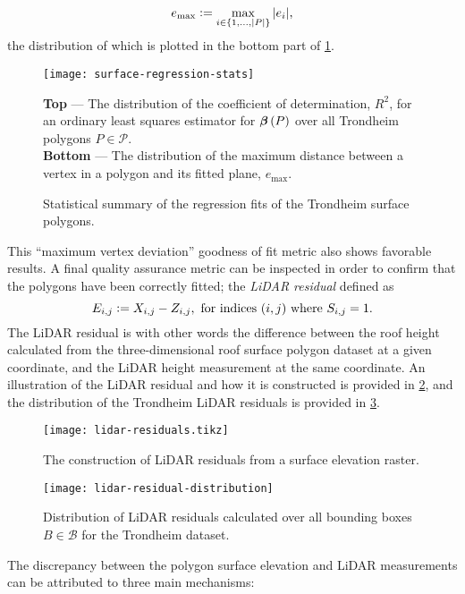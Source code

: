 \begin{equation*}
  e_{\mathrm{max}}
  \vcentcolon=
  \max_{i \in \{1, \ldots, |P|\}}
    |e_i|,
\end{equation*}
the distribution of which is plotted in the bottom part of \cref{fig:surface-regression-stats}.
\begin{figure}
  \texttt{[image: surface-regression-stats]}
  \caption{%
    Statistical summary of the regression fits of the Trondheim surface polygons.
  }{%
    \textbf{Top} --- The distribution of the coefficient of determination, $R^2$, for an ordinary least squares estimator for $\boldsymbol{\beta}\left(P\right)$ over all Trondheim polygons $P \in \mathcal{P}$.
    \\
    \textbf{Bottom} --- The distribution of the maximum distance between a vertex in a polygon and its fitted plane, $e_{\mathrm{max}}$.
  }%
  \label{fig:surface-regression-stats}
\end{figure}
This \enquote{maximum vertex deviation} goodness of fit metric also shows favorable results.
A final quality assurance metric can be inspected in order to confirm that the polygons have been correctly fitted; the \textit{LiDAR residual} defined as
\begin{equation*}
  E_{i, j}
  \vcentcolon=
  X_{i, j} - Z_{i, j}, \text{ for indices } (i, j) \text{ where } S_{i, j} = 1.
\end{equation*}
The LiDAR residual is with other words the difference between the roof height calculated from the three-dimensional roof surface polygon dataset at a given coordinate, and the LiDAR height measurement at the same coordinate.
An illustration of the LiDAR residual and how it is constructed is provided in \cref{fig:lidar-residuals}, and the distribution of the Trondheim LiDAR residuals is provided in \cref{fig:lidar-residual-distribution}.
\begin{figure}
  \centering
  \texttt{[image: lidar-residuals.tikz]}
  \caption{%
    The construction of LiDAR residuals from a surface elevation raster.
  }%
  \label{fig:lidar-residuals}
\end{figure}
\begin{figure}
  \centering
  \texttt{[image: lidar-residual-distribution]}
  \caption{%
    Distribution of LiDAR residuals calculated over all bounding boxes $B \in \mathcal{B}$ for the Trondheim dataset.
  }%
  \label{fig:lidar-residual-distribution}
\end{figure}
The discrepancy between the polygon surface elevation and LiDAR measurements can be attributed to three main mechanisms:
